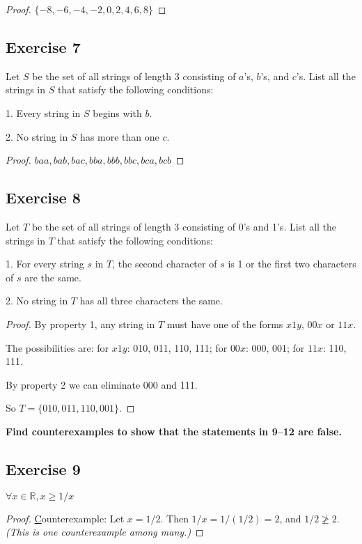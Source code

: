 \documentclass[14pt]{extarticle}
\newcommand{\R}{\mathbb{R}}
\newcommand{\fa}{\forall}
\begin{document}
\begin{proof}
    $\{-8, -6, -4, -2, 0, 2, 4, 6, 8\}$
\end{proof}

\subsection{Exercise 7}
Let $S$ be the set of all strings of length 3 consisting of $a$’s, $b$’s, and $c$’s. List all the strings in $S$ that satisfy the following conditions:

1. Every string in $S$ begins with $b$.

2. No string in $S$ has more than one $c$.

\begin{proof}
    $baa, bab, bac, bba, bbb, bbc, bca, bcb$
\end{proof}

\subsection{Exercise 8}
Let $T$ be the set of all strings of length 3 consisting of 0’s and 1’s. List all the strings in $T$ that satisfy the following conditions:

1. For every string $s$ in $T$, the second character of $s$ is 1 or the first two characters of $s$ are the same.

2. No string in $T$ has all three characters the same.

\begin{proof}
    By property 1, any string in $T$ must have one of the forms $x1y$, $00x$ or $11x$.

    The possibilities are: for $x1y$: 010, 011, 110, 111; for $00x$: 000, 001; for $11x$: 110, 111.

    By property 2 we can eliminate 000 and 111.

    So $T = \{010, 011, 110, 001\}$.
\end{proof}

{\bf \color{cyan} Find counterexamples to show that the statements in 9–12 are false.}

\subsection{Exercise 9}
$\fa x \in \R, x \geq 1/x$

\begin{proof}
    {\underline Counterexample}: Let $x = 1/2$. Then $1/x = 1/(1/2) = 2$, and $1/2 \ngeq 2$. {\it (This is one counterexample among many.)}
\end{proof}
\end{document}

